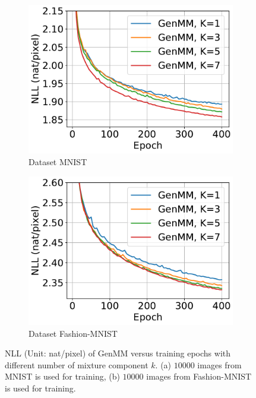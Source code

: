 \begin{figure}[!t]
  \captionsetup[subfigure]{justification=centering}
  \centering
  \begin{subfigure}{.4\textwidth}
    \centering
    \includegraphics[width=1\linewidth]{images/supply/mnist_GenMM_nll_curves-crop.pdf}
    
    \caption{Dataset MNIST}
    \label{fig-genmm-mnist-nll-curve}
  \end{subfigure}\hspace{1cm}
  \begin{subfigure}{.4\textwidth}
    \centering
    \includegraphics[width=1\linewidth]{images/supply/fashion_GenMM_nll_curves-crop.pdf}
    
    \caption{Dataset Fashion-MNIST}
    \label{fig-genmm-fsh-nll-curve}
  \end{subfigure}
  \caption{NLL (Unit: nat/pixel) of GenMM versus training epochs with different number of mixture component $k$. (a) $10000$ images from MNIST is used for training, (b) $10000$ images from Fashion-MNIST is used for training.}
  \label{fig:genmm-nll}
\end{figure}

